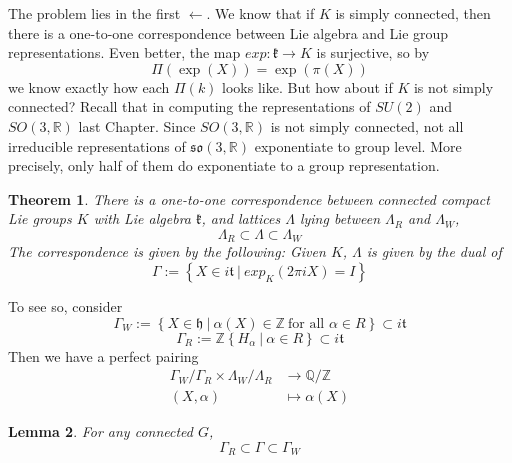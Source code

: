 \documentclass[11pt]{book}
\newtheorem{theorem}{Theorem}[section]
\newtheorem{lemma}[theorem]{Lemma}
\newcommand{\bb}[1]{\mathbb{#1}}
\newcommand{\mf}[1]{\mathfrak{#1}}
\begin{document}
\noindent The problem lies in the first $\leftarrow$. We know that if $K$ is simply connected, then there is a one-to-one correspondence between Lie algebra and Lie group representations. Even better, the map $exp: \mf{k} \to K$ is surjective, so by
$$\Pi(\exp(X)) = \exp(\pi(X))$$
we know exactly how each $\Pi(k)$ looks like. But how about if $K$ is not simply connected? Recall that in computing the representations of $SU(2)$ and $SO(3,\bb{R})$ last Chapter. Since $SO(3,\bb{R})$ is not simply connected, not all irreducible representations of $\mf{so}(3,\bb{R})$ exponentiate to group level. More precisely, only half of them do exponentiate to a group representation.\\
\begin{theorem}
There is a one-to-one correspondence between connected compact Lie groups $K$ with Lie algebra $\mf{k}$, and lattices $\Lambda$ lying between $\Lambda_R$ and $\Lambda_W$,
$$\Lambda_R \subset \Lambda \subset \Lambda_W$$
The correspondence is given by the following: Given $K$, $\Lambda$ is given by the dual of
$$\Gamma := \left\{ X \in i \mf{t}\ \Big|\ exp_K(2\pi iX) = I\right\}$$
\end{theorem}
To see so, consider
$$\Gamma_W := \left\{X \in \mf{h}\ \Big|\ \alpha(X) \in \bb{Z}\ \text{for all } \alpha \in R\right\} \subset i\mf{t}$$
$$\Gamma_R := \bb{Z}\left\{H_{\alpha}\ \Big|\ \alpha \in R\right\} \subset i\mf{t}$$
Then we have a perfect pairing
\begin{align*}
\Gamma_W/\Gamma_R \times \Lambda_W/\Lambda_R &\to \bb{Q}/\bb{Z}\\
(X, \alpha) &\mapsto \alpha(X)
\end{align*}
\begin{lemma}
For any connected $G$,
$$\Gamma_R \subset \Gamma \subset \Gamma_W$$
\end{lemma}
\end{document}
